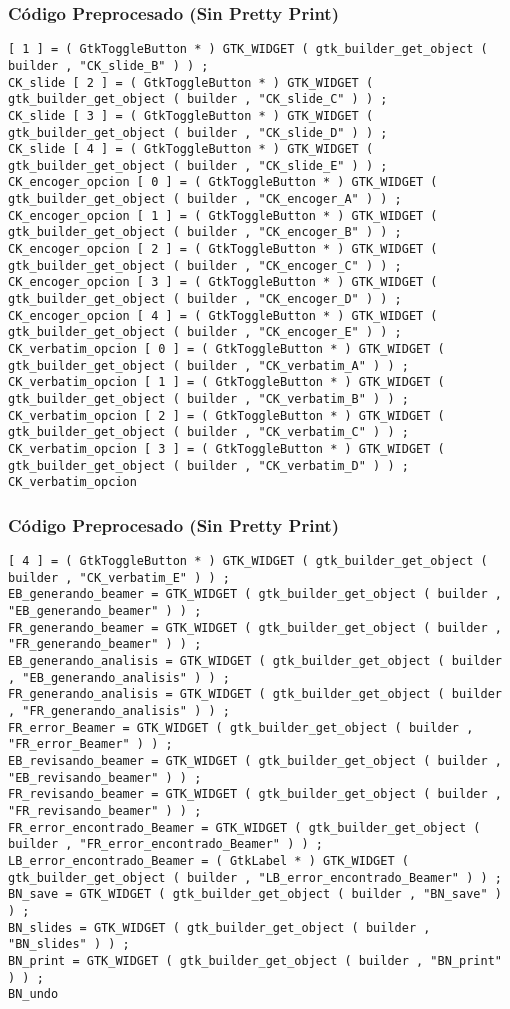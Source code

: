 \documentclass{beamer}
\begin{document}
\begin{frame}[fragile]
\frametitle{C\'odigo Preprocesado (Sin Pretty Print)}
\begin{lstlisting}[style=CStyle]
[ 1 ] = ( GtkToggleButton * ) GTK_WIDGET ( gtk_builder_get_object ( builder , "CK_slide_B" ) ) ; 
CK_slide [ 2 ] = ( GtkToggleButton * ) GTK_WIDGET ( gtk_builder_get_object ( builder , "CK_slide_C" ) ) ; 
CK_slide [ 3 ] = ( GtkToggleButton * ) GTK_WIDGET ( gtk_builder_get_object ( builder , "CK_slide_D" ) ) ; 
CK_slide [ 4 ] = ( GtkToggleButton * ) GTK_WIDGET ( gtk_builder_get_object ( builder , "CK_slide_E" ) ) ; 
CK_encoger_opcion [ 0 ] = ( GtkToggleButton * ) GTK_WIDGET ( gtk_builder_get_object ( builder , "CK_encoger_A" ) ) ; 
CK_encoger_opcion [ 1 ] = ( GtkToggleButton * ) GTK_WIDGET ( gtk_builder_get_object ( builder , "CK_encoger_B" ) ) ; 
CK_encoger_opcion [ 2 ] = ( GtkToggleButton * ) GTK_WIDGET ( gtk_builder_get_object ( builder , "CK_encoger_C" ) ) ; 
CK_encoger_opcion [ 3 ] = ( GtkToggleButton * ) GTK_WIDGET ( gtk_builder_get_object ( builder , "CK_encoger_D" ) ) ; 
CK_encoger_opcion [ 4 ] = ( GtkToggleButton * ) GTK_WIDGET ( gtk_builder_get_object ( builder , "CK_encoger_E" ) ) ; 
CK_verbatim_opcion [ 0 ] = ( GtkToggleButton * ) GTK_WIDGET ( gtk_builder_get_object ( builder , "CK_verbatim_A" ) ) ; 
CK_verbatim_opcion [ 1 ] = ( GtkToggleButton * ) GTK_WIDGET ( gtk_builder_get_object ( builder , "CK_verbatim_B" ) ) ; 
CK_verbatim_opcion [ 2 ] = ( GtkToggleButton * ) GTK_WIDGET ( gtk_builder_get_object ( builder , "CK_verbatim_C" ) ) ; 
CK_verbatim_opcion [ 3 ] = ( GtkToggleButton * ) GTK_WIDGET ( gtk_builder_get_object ( builder , "CK_verbatim_D" ) ) ; 
CK_verbatim_opcion \end{lstlisting}
\end{frame}
\begin{frame}[fragile]
\frametitle{C\'odigo Preprocesado (Sin Pretty Print)}
\begin{lstlisting}[style=CStyle]
[ 4 ] = ( GtkToggleButton * ) GTK_WIDGET ( gtk_builder_get_object ( builder , "CK_verbatim_E" ) ) ; 
EB_generando_beamer = GTK_WIDGET ( gtk_builder_get_object ( builder , "EB_generando_beamer" ) ) ; 
FR_generando_beamer = GTK_WIDGET ( gtk_builder_get_object ( builder , "FR_generando_beamer" ) ) ; 
EB_generando_analisis = GTK_WIDGET ( gtk_builder_get_object ( builder , "EB_generando_analisis" ) ) ; 
FR_generando_analisis = GTK_WIDGET ( gtk_builder_get_object ( builder , "FR_generando_analisis" ) ) ; 
FR_error_Beamer = GTK_WIDGET ( gtk_builder_get_object ( builder , "FR_error_Beamer" ) ) ; 
EB_revisando_beamer = GTK_WIDGET ( gtk_builder_get_object ( builder , "EB_revisando_beamer" ) ) ; 
FR_revisando_beamer = GTK_WIDGET ( gtk_builder_get_object ( builder , "FR_revisando_beamer" ) ) ; 
FR_error_encontrado_Beamer = GTK_WIDGET ( gtk_builder_get_object ( builder , "FR_error_encontrado_Beamer" ) ) ; 
LB_error_encontrado_Beamer = ( GtkLabel * ) GTK_WIDGET ( gtk_builder_get_object ( builder , "LB_error_encontrado_Beamer" ) ) ; 
BN_save = GTK_WIDGET ( gtk_builder_get_object ( builder , "BN_save" ) ) ; 
BN_slides = GTK_WIDGET ( gtk_builder_get_object ( builder , "BN_slides" ) ) ; 
BN_print = GTK_WIDGET ( gtk_builder_get_object ( builder , "BN_print" ) ) ; 
BN_undo \end{lstlisting}
\end{frame}
\end{document}

